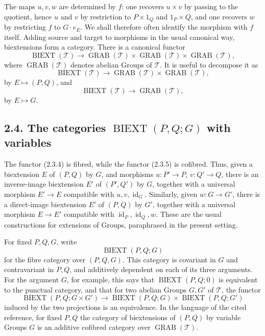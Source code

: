 \documentclass[11pt]{article}
\providecommand{\id}{\operatorname{id}}
\providecommand{\BIEXT}{\operatorname{BIEXT}}
\providecommand{\GRAB}{\operatorname{GRAB}}
\providecommand{\id}{\mathrm{id}}
\begin{document}
The maps \(u,v,w\) are determined by \(f\): one recovers \(u\times v\) by passing to the quotient, hence \(u\) and \(v\) by restriction to \(P\times1_Q\) and \(1_P\times Q\), and one recovers \(w\) by restricting \(f\) to \(G\cdot e_E\).  We shall therefore often identify the morphism with \(f\) itself.  Adding source and target to morphisms in the usual canonical way, biextensions form a category.  There is a canonical functor
\begin{equation}\tag{2.3.3}
  \BIEXT(\mathcal T)\longrightarrow \GRAB(\mathcal T)\times\GRAB(\mathcal T)\times\GRAB(\mathcal T),
\end{equation}
where \(\GRAB(\mathcal T)\) denotes abelian Groups of \(\mathcal T\).  It is useful to decompose it as
\begin{equation}\tag{2.3.4}
  \BIEXT(\mathcal T)\longrightarrow\GRAB(\mathcal T)\times\GRAB(\mathcal T),
\end{equation}
by \(E\mapsto(P,Q)\), and
\begin{equation}\tag{2.3.5}
  \BIEXT(\mathcal T)\longrightarrow\GRAB(\mathcal T),
\end{equation}
by \(E\mapsto G\).

\subsection*{2.4. The categories \(\BIEXT(P,Q;G)\) with variables}
The functor (2.3.4) is fibred, while the functor (2.3.5) is cofibred.  Thus, given a biextension \(E\) of \((P,Q)\) by \(G\), and morphisms \(u:P'\to P\), \(v:Q'\to Q\), there is an inverse-image biextension \(E'\) of \((P',Q')\) by \(G\), together with a universal morphism \(E'\to E\) compatible with \(u,v,\id_G\).  Similarly, given \(w:G\to G'\), there is a direct-image biextension \(E'\) of \((P,Q)\) by \(G'\), together with a universal morphism \(E\to E'\) compatible with \(\id_P,\id_Q,w\).  These are the usual constructions for extensions of Groups, paraphrased in the present setting.

For fixed \(P,Q,G\), write
\begin{equation}\tag{2.4.1}
  \BIEXT(P,Q;G)
\end{equation}
for the fibre category over \((P,Q,G)\).  This category is covariant in \(G\) and contravariant in \(P,Q\), and additively dependent on each of its three arguments.  For the argument \(G\), for example, this says that \(\BIEXT(P,Q;0)\) is equivalent to the punctual category, and that for two abelian Groups \(G,G'\) of \(\mathcal T\), the functor
\begin{equation}\tag{2.4.2}
  \BIEXT(P,Q;G\times G')\longrightarrow
  \BIEXT(P,Q;G)\times\BIEXT(P,Q;G')
\end{equation}
induced by the two projections is an equivalence.  In the language of the cited reference, for fixed \(P,Q\) the category of biextensions of \((P,Q)\) by variable Groups \(G\) is an additive cofibred category over \(\GRAB(\mathcal T)\).
\end{document}
